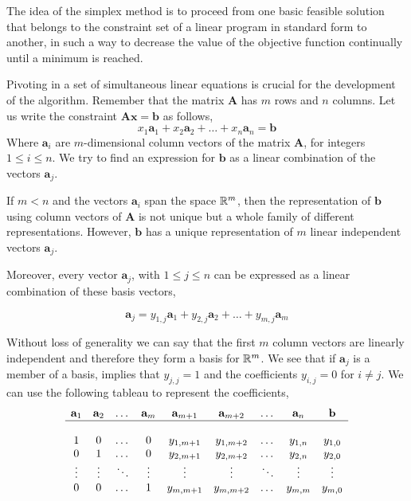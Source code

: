 The idea of the simplex method is to proceed from one basic feasible solution that belongs to the constraint set of a linear program in standard form to another, in such a way to decrease the value of the objective function continually until a minimum is reached. 

Pivoting in a set of simultaneous linear equations is crucial for the development of the algorithm. Remember that the matrix $\mathbf{A}$ has $m$ rows and $n$ columns. Let us write the constraint $\mathbf{Ax}=\mathbf{b}$ as follows,
\begin{equation*}
x_1\mathbf{a}_1+x_2\mathbf{a}_2+\dots+x_n\mathbf{a}_n=\mathbf{b}
\end{equation*}
Where $\mathbf{a}_i$ are $m$-dimensional column vectors of the matrix $\mathbf{A}$, for integers $1\leq i\leq n$. We try to find an expression for $\mathbf{b}$ as a linear combination of the vectors $\mathbf{a}_j$. 

If $m<n$ and the vectors $\mathbf{a}_i$ span the space $\mathbb{R}^m$, then the representation of $\mathbf{b}$ using column vectors of $\mathbf{A}$ is not unique but a whole family of different representations. However, $\mathbf{b}$ has a unique representation of $m$ linear independent vectors $\mathbf{a}_j$. 

Moreover, every vector $\mathbf{a}_j$, with $1\leq j \leq n$ can be expressed as a linear combination of these basis vectors,

\begin{equation*}
	\mathbf{a}_j= y_{1,j}\mathbf{a}_1+y_{2,j}\mathbf{a}_2+\dots+y_{m,j}\mathbf{a}_{m}
\end{equation*}




Without loss of generality we can say that the first $m$ column vectors are linearly independent and therefore they form a basis for $\mathbb{R} ^m$. We see that if $\mathbf{a}_j$ is a member of a basis, implies that $y_{j,j}=1$ and the coefficients $y_{i,j}=0$ for $i\neq j$. We can use the following tableau to represent the coefficients,  
\begin{equation}
	\begin{array}{ccccccccc}
	\mathbf{a}_1 & \mathbf{a}_2 &\dots &\mathbf{a}_m & \mathbf{a}_{m+1}& \mathbf{a}_{m+2} &\dots &\mathbf{a}_n & \mathbf{b}\\
	\hline\\
	1 &0&\dots&0 & y_{1,m+1} & y_{1, m+2} &\dots & y_{1, n} & y_{1,0} \\
	0 &1&\dots&0 & y_{2,m+1} & y_{2, m+2} &\dots & y_{2, n} & y_{2,0} \\
	\vdots &\vdots&\ddots &\vdots&\vdots & \vdots & \ddots & \vdots & \vdots \\
	0 & 0 & \dots & 1 & y_{m, m+1}& y_{m,m+2} &\dots & y_{m,m} & y_{m, 0}
	\end{array}\label{eq: Linear Programming tableau}
\end{equation}

